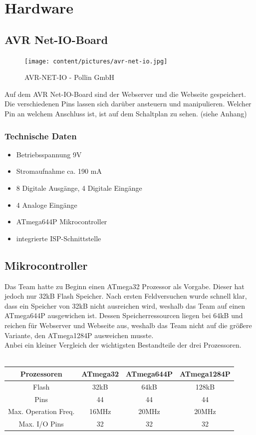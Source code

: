 \chapter{Hardware}
\section{AVR Net-IO-Board}
\begin{figure}[h]
\centering
\texttt{[image: content/pictures/avr-net-io.jpg]}
\caption{AVR-NET-IO - Pollin GmbH}
\label{fig:B3}
\end{figure}
Auf dem AVR Net-IO-Board sind der Webserver und die Webseite gespeichert. Die verschiedenen Pins lassen sich darüber 
ansteuern und manipulieren. Welcher Pin an welchem Anschluss ist, ist auf dem Schaltplan zu sehen. (siehe Anhang)

\subsection{Technische Daten}
\begin{itemize}
  \item Betriebsspannung 9V 
  \item Stromaufnahme ca. 190 mA
  \item 8 Digitale Ausgänge, 4 Digitale Eingänge
  \item 4 Analoge Eingänge
  \item ATmega644P Mikrocontroller
  \item integrierte ISP-Schnittstelle
\end{itemize}
\newpage
\section{Mikrocontroller}
Das Team hatte zu Beginn einen ATmega32 Prozessor als Vorgabe. Dieser hat jedoch nur 32kB Flash Speicher. Nach ersten 
Feldversuchen wurde schnell klar, dass ein Speicher von 32kB nicht ausreichen wird, weshalb das Team auf einen ATmega644P 
ausgewichen ist. Dessen Speicherressourcen liegen bei 64kB und reichen für Webserver und Webseite aus, weshalb das Team 
nicht auf die größere Variante, den ATmega1284P ausweichen musste.\\ Anbei ein kleiner Vergleich der wichtigsten Bestandteile der 
drei Prozessoren.\\ \\ 
\begin{tabular}{|c|c|c|c|} \hline
  Prozessoren & ATmega32 & ATmega644P & ATmega1284P \\ \hline 
  Flash & 32kB & 64kB & 128kB \\ \hline
  Pins & 44 & 44 & 44 \\ \hline
  Max. Operation Freq. & 16MHz & 20MHz & 20MHz\\ \hline
  Max. I/O Pins & 32 & 32 & 32 \\ \hline
  
 \end{tabular}


